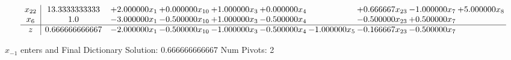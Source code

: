 \documentclass[10pt]{article}
\begin{document}
\[\begin{array}{c| c c@{\hskip 2pt} c@{\hskip 2pt} c@{\hskip 2pt} c@{\hskip 2pt} c@{\hskip 2pt} c@{\hskip 2pt} c@{\hskip 2pt} c@{\hskip 2pt} }
 x_{22}   &  13.3333333333 & + 2.000000 x_{1} & + 0.000000 x_{10} & + 1.000000 x_{3} & + 0.000000 x_{4} &   & + 0.666667 x_{23} & -1.000000 x_{7} & + 5.000000 x_{8}\\
 x_{6}   &  1.0 & -3.000000 x_{1} & -0.500000 x_{10} & + 1.000000 x_{3} & -0.500000 x_{4} &   & -0.500000 x_{23} & + 0.500000 x_{7} &   \\
\hline
z    &  0.666666666667 & -2.000000 x_{1} & -0.500000 x_{10} & -1.000000 x_{3} & -0.500000 x_{4} & -1.000000 x_{5} & -0.166667 x_{23} & -0.500000 x_{7} &   \\
\end{array}\]


 $ x_{-1} $ enters and Final Dictionary
Solution:  0.666666666667
Num Pivots:  2
\end{document}
